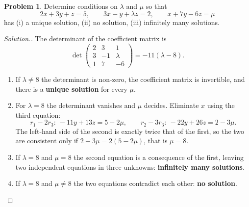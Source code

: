 \documentclass[11pt,a4paper]{article}
\theoremstyle{definition}
\newtheorem{problemx}{Problem}[section]
\newenvironment{problem}{\begin{problemx}}{\end{problemx}}
\newenvironment{solution}
  {\renewcommand{\qedsymbol}{}\begin{proof}[\textit{Solution}.]}
  {\end{proof}}
\begin{document}
\begin{problem}
Determine conditions on $\lambda$ and $\mu$ so that
$$2x+3y+z=5,\qquad 3x-y+\lambda z=2,\qquad x+7y-6z=\mu$$
has (i) a unique solution, (ii) no solution, (iii) infinitely many solutions.
\end{problem}
\begin{solution}
The determinant of the coefficient matrix is
$$\det\begin{pmatrix}2&3&1\\3&-1&\lambda\\1&7&-6\end{pmatrix}=-11(\lambda-8).$$
\begin{enumerate}
\item[(i)] If $\lambda\neq 8$ the determinant is non-zero, the coefficient
matrix is invertible, and there is a \textbf{unique solution} for every $\mu$.
\item[] For $\lambda=8$ the determinant vanishes and $\mu$ decides. Eliminate
$x$ using the third equation:
$$r_1-2r_3:\ -11y+13z=5-2\mu,\qquad r_2-3r_3:\ -22y+26z=2-3\mu.$$
The left-hand side of the second is exactly twice that of the first, so the two
are consistent only if $2-3\mu=2(5-2\mu)$, that is $\mu=8$.
\item[(iii)] If $\lambda=8$ and $\mu=8$ the second equation is a consequence of
the first, leaving two independent equations in three unknowns:
\textbf{infinitely many solutions}.
\item[(ii)] If $\lambda=8$ and $\mu\neq 8$ the two equations contradict each
other: \textbf{no solution}.
\end{enumerate}
\end{solution}
\end{document}
